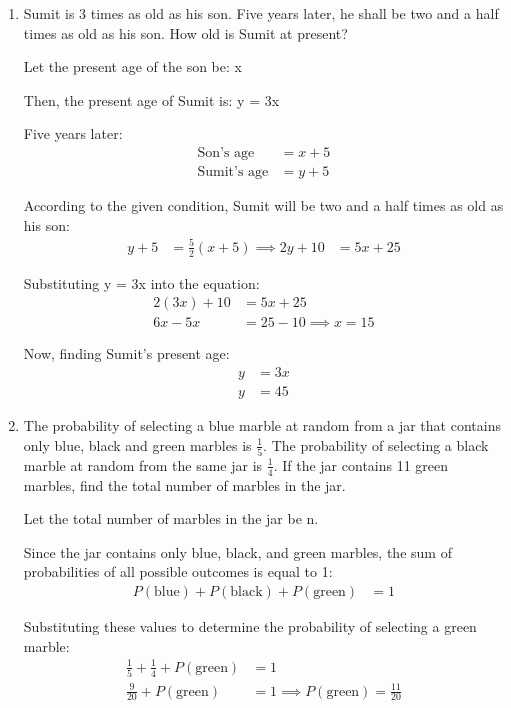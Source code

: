 \begin{enumerate}[label=\thesubsection.\arabic*, ref=\thesubsection.\theenumi]
	Therefore, the two supplementary angles are:
	\begin{align*}
		x &= 99^\circ & y &= 81^\circ
	\end{align*}
	
	
	\item Sumit is 3 times as old as his son. Five years later, he shall be two and a half times as old as his son. How old is Sumit at present?
	
	\solution
	Let the present age of the son be: x 
	
	Then, the present age of Sumit is: y = 3x
	
	Five years later:
	\begin{align*}
		\text{Son's age} &= x + 5 \\
		\text{Sumit's age} &= y + 5
	\end{align*}
	
	According to the given condition, Sumit will be two and a half times as old as his son:
	\begin{align*}
		y + 5 &= \frac{5}{2}(x + 5) \implies 2y + 10 & = 5x + 25
	\end{align*}
	
	Substituting y = 3x into the equation:
	\begin{align*}
		2(3x) + 10 &= 5x + 25 \\
		6x - 5x &= 25 - 10 \implies x = 15
	\end{align*}
	
	Now, finding Sumit's present age:
	\begin{align*}
		y &= 3x \\
		y &= 45
	\end{align*}
	
	
	\item  The probability of selecting a blue marble at random from a jar that contains only blue, black and green marbles is $\frac{1}{5}$. The probability of selecting a black marble at random from the same jar is $\frac{1}{4}$. If the jar contains 11 green marbles, find the total number of marbles in the jar.
	
	\solution
	Let the total number of marbles in the jar be n.
	
	Since the jar contains only blue, black, and green marbles, the sum of probabilities of all possible outcomes is equal to 1:
	\begin{align*}
		P(\text{blue}) + P(\text{black}) + P(\text{green}) &= 1
	\end{align*}
	
	
	Substituting these values to determine the probability of selecting a green marble:
	\begin{align*}
		\frac{1}{5} + \frac{1}{4} + P(\text{green}) &= 1 \\
		\frac{9}{20} + P(\text{green}) &= 1 \implies
		P(\text{green}) = \frac{11}{20}
	\end{align*}
	

\end{enumerate}
